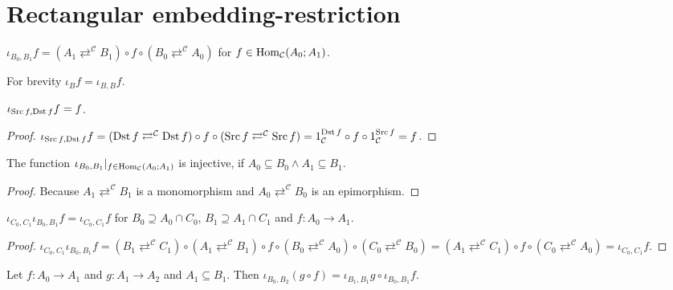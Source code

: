 \section{Rectangular embedding-restriction}

\begin{defn}
  $\iota_{B_0, B_1} f = (A_1 \rightleftarrows^{\mathcal{C}} B_1) \circ f \circ
  (B_0 \rightleftarrows^{\mathcal{C}} A_0)$ for $f \in
  \operatorname{Hom}_{\mathcal{C}} (A_0 ; A_1)$.
\end{defn}

For brevity $\iota_B f = \iota_{B, B} f$.

\begin{prop}
  $\iota_{\operatorname{Src} f, \operatorname{Dst} f} f = f$.
\end{prop}

\begin{proof}
  $\iota_{\operatorname{Src} f, \operatorname{Dst} f} f = (\operatorname{Dst} f
  \rightleftarrows^{\mathcal{C}} \operatorname{Dst} f) \circ f \circ (\operatorname{Src} f
  \rightleftarrows^{\mathcal{C}} \operatorname{Src} f) = 1_{\mathcal{C}}^{\operatorname{Dst}
  f} \circ f \circ 1_{\mathcal{C}}^{\operatorname{Src} f} = f$.
\end{proof}

\begin{prop}
  The function $\iota_{B_0, B_1} |_{f \in \operatorname{Hom}_{\mathcal{C}} (A_0 ;
  A_1)}$ is injective, if $A_0 \subseteq B_0 \wedge A_1 \subseteq B_1$.
\end{prop}

\begin{proof}
  Because $A_1 \rightleftarrows^{\mathcal{C}} B_1$ is a monomorphism and $A_0
  \rightleftarrows^{\mathcal{C}} B_0$ is an epimorphism.
\end{proof}

\begin{prop}
  $\iota_{C_0, C_1} \iota_{B_0, B_1} f = \iota_{C_0, C_1} f$ for $B_0
  \supseteq A_0 \cap C_0$, $B_1 \supseteq A_1 \cap C_1$ and $f : A_0
  \rightarrow A_1$.
\end{prop}

\begin{proof}
  $\iota_{C_0, C_1} \iota_{B_0, B_1} f = (B_1 \rightleftarrows^{\mathcal{C}}
  C_1) \circ (A_1 \rightleftarrows^{\mathcal{C}} B_1) \circ f \circ (B_0
  \rightleftarrows^{\mathcal{C}} A_0) \circ (C_0
  \rightleftarrows^{\mathcal{C}} B_0) = (A_1 \rightleftarrows^{\mathcal{C}}
  C_1) \circ f \circ (C_0 \rightleftarrows^{\mathcal{C}} A_0) = \iota_{C_0,
  C_1} f$.
\end{proof}

\begin{prop}
  Let $f : A_0 \rightarrow A_1$ and $g : A_1 \rightarrow A_2$ and $A_1
  \subseteq B_1$. Then $\iota_{B_0, B_2} (g \circ f) = \iota_{B_1, B_1} g
  \circ \iota_{B_0, B_1} f$.
\end{prop}

